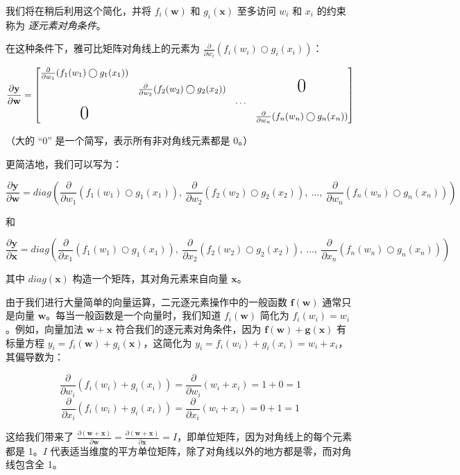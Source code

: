 \documentclass{ctexart}
\begin{document}
我们将在稍后利用这个简化，并将 $f_i(\mathbf{w})$ 和 $g_i(\mathbf{x})$ 至多访问 $w_i$ 和 $x_i$ 的约束称为 {\em 逐元素对角条件}。

在这种条件下，雅可比矩阵对角线上的元素为 $\frac{\partial}{\partial w_i} ( f_i(w_i) \bigcirc g_i(x_i) )$：

\[\frac{\partial \mathbf{y}}{\partial \mathbf{w}}  = \begin{bmatrix}
\frac{\partial}{\partial w_1} ( f_{1}(w_1) \bigcirc g_{1}(x_1) )\\
& \frac{\partial}{\partial w_2} (f_{2}(w_2) \bigcirc g_{2}(x_2) ) & & \text{\huge0}\\
& & \ldots \\
\text{\huge0}& & & \frac{\partial}{\partial w_n} (f_{n}(w_n) \bigcirc g_{n}(x_n) )
\end{bmatrix}\]

（大的 ``0'' 是一个简写，表示所有非对角线元素都是 0。）

更简洁地，我们可以写为：

\[\frac{\partial \mathbf{y}}{\partial \mathbf{w}} = diag \left( \frac{\partial}{\partial w_1}(f_{1}(w_1) \bigcirc g_{1}(x_1)),~ \frac{\partial}{\partial w_2}(f_{2}(w_2) \bigcirc g_{2}(x_2)),~ \ldots,~ \frac{\partial}{\partial w_n}(f_{n}(w_n) \bigcirc g_{n}(x_n)) \right)\]

和

\[\frac{\partial \mathbf{y}}{\partial \mathbf{x}} = diag \left( \frac{\partial}{\partial x_1}(f_{1}(w_1) \bigcirc g_{1}(x_1)),~ \frac{\partial}{\partial x_2}(f_{2}(w_2) \bigcirc g_{2}(x_2)),~ \ldots,~ \frac{\partial}{\partial x_n}(f_{n}(w_n) \bigcirc g_{n}(x_n)) \right)\]

其中 $diag(\mathbf{x})$ 构造一个矩阵，其对角元素来自向量 $\mathbf{x}$。

由于我们进行大量简单的向量运算，二元逐元素操作中的一般函数 $\mathbf{f(w)}$ 通常只是向量 $\mathbf{w}$。每当一般函数是一个向量时，我们知道 $f_i(\mathbf{w})$ 简化为 $f_i(w_i) = w_i$。例如，向量加法 $\mathbf{w + x}$ 符合我们的逐元素对角条件，因为 $\mathbf{f(w)} + \mathbf{g(x)}$ 有标量方程 $y_i = f_i(\mathbf{w}) + g_i(\mathbf{x})$，这简化为 $y_i = f_i(w_i) + g_i(x_i) = w_i + x_i$，其偏导数为：

\[\frac{\partial}{\partial w_i} ( f_{i}(w_i) + g_{i}(x_i) ) = \frac{\partial}{\partial w_i}(w_i + x_i) = 1 + 0 = 1\]\[\frac{\partial}{\partial x_i} ( f_{i}(w_i) + g_{i}(x_i) ) = \frac{\partial}{\partial x_i}(w_i + x_i) = 0 + 1 = 1\]

这给我们带来了 $\frac{\partial (\mathbf{w+x})}{\partial \mathbf{w}} = \frac{\partial (\mathbf{w+x})}{\partial \mathbf{x}} = I$，即单位矩阵，因为对角线上的每个元素都是 1。$I$ 代表适当维度的平方单位矩阵，除了对角线以外的地方都是零，而对角线包含全 1。
\end{document}

